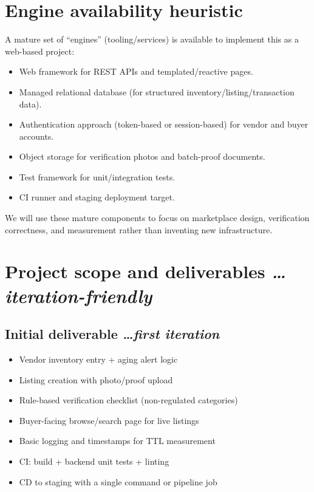 \documentclass[11pt,a4paper]{article}
\newcommand{\BvrHint}[1]{%
  {\normalfont\normalsize\itshape\hfill #1}}
\begin{document}
\section{Engine availability heuristic}
A mature set of ``engines'' (tooling/services) is
available to implement this as a web-based project:
\begin{itemize}[leftmargin=0.7cm]
    \item Web framework for REST APIs and templated/reactive pages.
    \item Managed relational database (for structured inventory/listing/transaction data).
    \item Authentication approach (token-based or session-based) for vendor and buyer accounts.
    \item Object storage for verification photos and batch-proof documents.
    \item Test framework for unit/integration tests.
    \item CI runner and staging deployment target.
\end{itemize}
We will use these mature components to focus on
marketplace design, verification correctness, and
measurement rather than inventing new infrastructure.

\section{Project scope and deliverables %
\BvrHint{\ldots iteration-friendly}}
\subsection{Initial deliverable %
\BvrHint{\ldots first iteration}}
\begin{itemize}[leftmargin=0.7cm]
    \item Vendor inventory entry + aging alert logic
    \item Listing creation with photo/proof upload
    \item Rule-based verification checklist (non-regulated categories)
    \item Buyer-facing browse/search page for live listings
    \item Basic logging and timestamps for TTL measurement
    \item CI: build + backend unit tests + linting
    \item CD to staging with a single command or pipeline job
\end{itemize}
\end{document}
